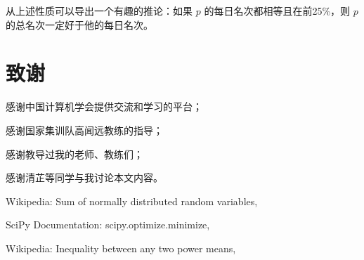             从上述性质可以导出一个有趣的推论：如果 $p$ 的每日名次都相等且在前25\%，则 $p$ 的总名次一定好于他的每日名次。

\section{致谢}

    感谢中国计算机学会提供交流和学习的平台；

    感谢国家集训队高闻远教练的指导；

    感谢教导过我的老师、教练们；

    感谢清芷等同学与我讨论本文内容。

\begin{thebibliography}{9}
    Wikipedia: Sum of normally distributed random variables,\\

    SciPy Documentation: scipy.optimize.minimize,\\

    Wikipedia: Inequality between any two power means,\\
\end{thebibliography}